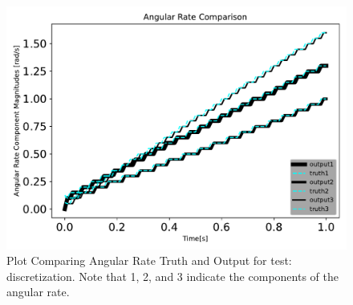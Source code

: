 \begin{figure}[htbp]\centerline{\includegraphics[height=0.7\textwidth, keepaspectratio]{AutoTeX/discretizationomegaComparison}}\caption{Plot Comparing Angular Rate Truth and Output for test: discretization. Note that 1, 2, and 3 indicate the components of the angular rate.}\label{fig:discretizationomegaComparison}\end{figure}